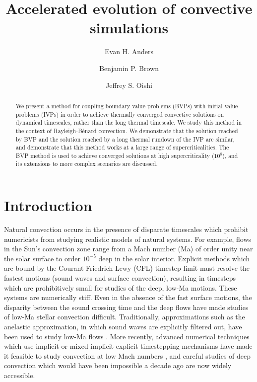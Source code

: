\documentclass[aps, pre, onecolumn, nofootinbib, notitlepage, groupedaddress, amsfonts, amssymb, amsmath, longbibliography]{revtex4-1}
\newcommand{\RB}{Rayleigh-B\'{e}nard }
\begin{document}
\author{Evan H. Anders}
\author{Benjamin P. Brown}
\author{Jeffrey S. Oishi}
\title{Accelerated evolution of convective simulations}

\begin{abstract}
We present a method for coupling boundary value problems (BVPs) with initial value problems (IVPs)
in order to achieve thermally converged convective solutions on dynamical timescales, rather than the
long thermal timescale. We study this method in the context of \RB convection. 
We demonstrate that the solution reached by BVP and the
solution reached by a long thermal rundown of the IVP are similar, and demonstrate that this method works at a
large range of supercriticalities.  The BVP method is used to achieve converged solutions at high supercriticality ($10^8$),
and its extensions to more complex scenarios are discussed.
\end{abstract}
\maketitle


\section{Introduction}
\label{sec:intro}
Natural convection occurs in the presence of disparate timescales which
prohibit numericists from studying realistic models of natural systems.  For example,
flows in the Sun's convection zone range from a Mach number (Ma) of order unity
near the solar surface to order $10^{-5}$ deep in the solar interior.
Explicit methods which are bound by the Courant-Friedrich-Lewy
(CFL) timestep limit must resolve the fastest motions (sound
waves and surface convection), resulting in timesteps which are prohibitively
small for studies of the deep, low-Ma motions. These systems are numerically
stiff. Even in the absence of the fast surface motions, the disparity between
the sound crossing time and the deep flows have made studies of low-Ma stellar
convection difficult. Traditionally, approximations such as
the anelastic approximation, in which sound waves are explicitly filtered out,
have been used to study low-Ma flows \cite{brown&all2010, featherstone&hindman2016}.
More recently, advanced numerical techniques which use implicit or mixed
implicit-explicit timestepping mechanisms have made it feasible to study
convection at low Mach numbers \cite{viallet&all2011, viallet&all2013, viallet&all2016, lecoanet&all2014,
anders&brown2017, bordwell&all2018}, and careful studies of deep convection which
would have been impossible a decade ago are now widely accessible.
\end{document}
